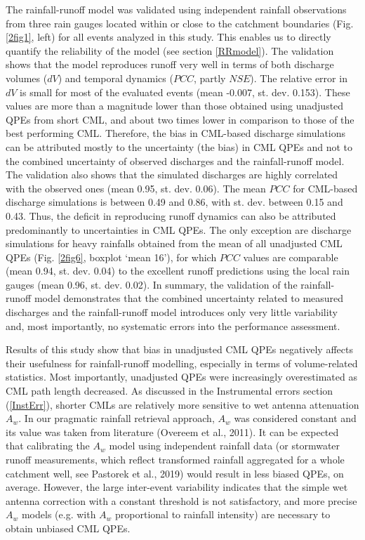 \documentclass{ctuthesis}\usepackage[]{graphicx}\usepackage[]{color}
\begin{document}
The rainfall-runoff model was validated using independent rainfall observations from three rain gauges located within or close to the catchment boundaries (Fig. \ref{2fig1}, left) for all events analyzed in this study. This enables us to directly quantify the reliability of the model (see section \ref{RRmodel}). The validation shows that the model reproduces runoff very well in terms of both discharge volumes ($dV$) and temporal dynamics ($PCC$, partly $NSE$). The relative error in $dV$ is small for most of the evaluated events (mean -0.007, st. dev. 0.153). These values are more than a magnitude lower than those obtained using unadjusted QPEs from short CML, and about two times lower in comparison to those of the best performing CML. Therefore, the bias in CML-based discharge simulations can be attributed mostly to the uncertainty (the bias) in CML QPEs and not to the combined uncertainty of observed discharges and the rainfall-runoff model. The validation also shows that the simulated discharges are highly correlated with the observed ones (mean 0.95, st. dev. 0.06). The mean $PCC$ for CML-based discharge simulations is between 0.49 and 0.86, with st. dev. between 0.15 and 0.43. Thus, the deficit in reproducing runoff dynamics can also be attributed predominantly to uncertainties in CML QPEs. The only exception are discharge simulations for heavy rainfalls obtained from the mean of all unadjusted CML QPEs (Fig. \ref{2fig6}, boxplot ‘mean 16’), for which $PCC$ values are comparable (mean 0.94, st. dev. 0.04) to the excellent runoff predictions using the local rain gauges (mean 0.96, st. dev. 0.02). In summary, the validation of the rainfall-runoff model demonstrates that the combined uncertainty related to measured discharges and the rainfall-runoff model introduces only very little variability and, most importantly, no systematic errors into the performance assessment.

Results of this study show that bias in unadjusted CML QPEs negatively affects their usefulness for rainfall-runoff modelling, especially in terms of volume-related statistics. Most importantly, unadjusted QPEs were increasingly overestimated as CML path length decreased. As discussed in the Instrumental errors section (\ref{InstErr}), shorter CMLs are relatively more sensitive to wet antenna attenuation $A_w$. In our pragmatic rainfall retrieval approach, $A_w$ was considered constant and its value was taken from literature (Overeem et al., 2011). It can be expected that calibrating the $A_w$ model using independent rainfall data (or stormwater runoff measurements, which reflect transformed rainfall aggregated for a whole catchment well, see Pastorek et al., 2019) would result in less biased QPEs, on average. However, the large inter-event variability indicates that the simple wet antenna correction with a constant threshold is not satisfactory, and more precise $A_w$ models (e.g. with $A_w$ proportional to rainfall intensity) are necessary to obtain unbiased CML QPEs.
 
\end{document}
